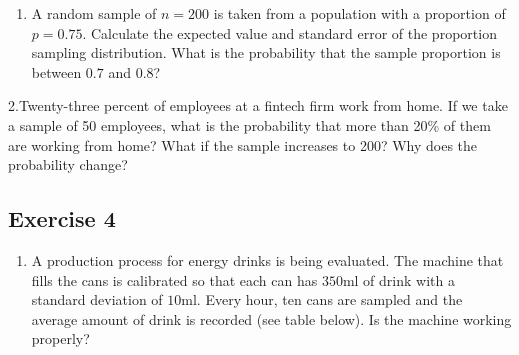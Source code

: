 \documentclass[
  letterpaper,
  DIV=11,
  numbers=noendperiod]{scrreprt}
\providecommand{\tightlist}{%
  \setlength{\itemsep}{0pt}\setlength{\parskip}{0pt}}\usepackage{longtable,booktabs,array}
\begin{document}
\begin{enumerate}
\def\labelenumi{\arabic{enumi}.}
\tightlist
\item
  A random sample of \(n=200\) is taken from a population with a
  proportion of \(p=0.75\). Calculate the expected value and standard
  error of the proportion sampling distribution. What is the probability
  that the sample proportion is between \(0.7\) and \(0.8\)?
\end{enumerate}

2.Twenty-three percent of employees at a fintech firm work from home. If
we take a sample of 50 employees, what is the probability that more than
20\% of them are working from home? What if the sample increases to 200?
Why does the probability change?

\hypertarget{exercise-4-8}{%
\subsection*{Exercise 4}\label{exercise-4-8}}

\begin{enumerate}
\def\labelenumi{\arabic{enumi}.}
\tightlist
\item
  A production process for energy drinks is being evaluated. The machine
  that fills the cans is calibrated so that each can has \(350\)ml of
  drink with a standard deviation of \(10\)ml. Every hour, ten cans are
  sampled and the average amount of drink is recorded (see table below).
  Is the machine working properly?
\end{enumerate}
\end{document}
